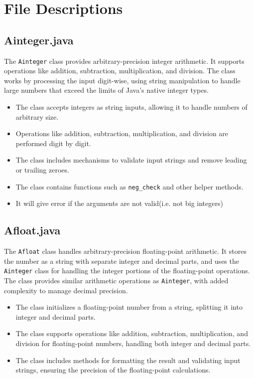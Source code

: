 \documentclass[12pt]{article}
\begin{document}
\section{File Descriptions}
\subsection{Ainteger.java}
The \texttt{Ainteger} class provides arbitrary-precision integer arithmetic. It supports operations like addition, subtraction, multiplication, and division. The class works by processing the input digit-wise, using string manipulation to handle large numbers that exceed the limits of Java's native integer types.

\begin{itemize}
    \item The class accepts integers as string inputs, allowing it to handle numbers of arbitrary size.
    \item Operations like addition, subtraction, multiplication, and division are performed digit by digit.
    \item The class includes mechanisms to validate input strings and remove leading or trailing zeroes.
    \item The class contains functions such as \texttt{neg\_check} and other helper methods.
    \item It will give error if the arguments are not valid(i.e. not big integers)
\end{itemize}


\subsection{Afloat.java}
The \texttt{Afloat} class handles arbitrary-precision floating-point arithmetic. It stores the number as a string with separate integer and decimal parts, and uses the \texttt{Ainteger} class for handling the integer portions of the floating-point operations. The class provides similar arithmetic operations as \texttt{Ainteger}, with added complexity to manage decimal precision.

\begin{itemize}
    \item The class initializes a floating-point number from a string, splitting it into integer and decimal parts.
    \item The class supports operations like addition, subtraction, multiplication, and division for floating-point numbers, handling both integer and decimal parts.
    \item The class includes methods for formatting the result and validating input strings, ensuring the precision of the floating-point calculations.
\end{itemize}
\end{document}
